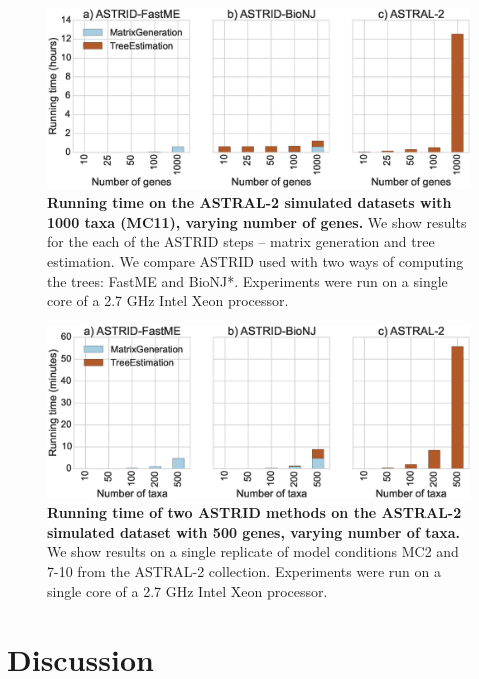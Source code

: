 \begin{figure}
  \centering
  \includegraphics[width=12cm]{astrid-figs/1000-timing.eps}
  \caption[Running time 
on the ASTRAL-2 
    simulated datasets with 1000 taxa]{\textbf{Running time 
on the ASTRAL-2 
    simulated datasets with 1000 taxa (MC11), varying number of
    genes.} 
We show results for the each of the ASTRID steps -- matrix generation 
and tree estimation. We compare ASTRID used with two
ways of computing the trees: FastME and BioNJ*.
Experiments were run on a single core of a 2.7 GHz Intel Xeon processor. 
}
  \label{astrid::fig:1000-timing}
\end{figure}


\begin{figure}
  \centering
  \includegraphics[width=12cm]{astrid-figs/astral-timing.eps}
  \caption[Running time of two ASTRID methods on the ASTRAL-2 
    simulated dataset, varying number of
    taxa.]{\textbf{Running time of two ASTRID methods on the ASTRAL-2 
    simulated dataset with 500 genes, varying number of
    taxa.} We show results on a single
replicate of model conditions MC2 and 7-10 from
the ASTRAL-2 collection. Experiments were run on a single core of a 2.7 GHz Intel
    Xeon processor.}
  \label{astrid::fig:astral-timing}
\end{figure}

\section{Discussion}

